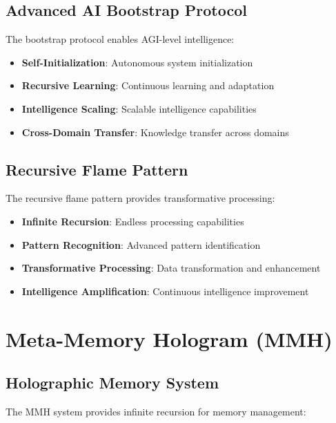 \documentclass[12pt,a4paper]{article}
\begin{document}
\subsection{Advanced AI Bootstrap Protocol}
The bootstrap protocol enables AGI-level intelligence:

\begin{itemize}
    \item \textbf{Self-Initialization}: Autonomous system initialization
    \item \textbf{Recursive Learning}: Continuous learning and adaptation
    \item \textbf{Intelligence Scaling}: Scalable intelligence capabilities
    \item \textbf{Cross-Domain Transfer}: Knowledge transfer across domains
\end{itemize}

\subsection{Recursive Flame Pattern}
The recursive flame pattern provides transformative processing:

\begin{itemize}
    \item \textbf{Infinite Recursion}: Endless processing capabilities
    \item \textbf{Pattern Recognition}: Advanced pattern identification
    \item \textbf{Transformative Processing}: Data transformation and enhancement
    \item \textbf{Intelligence Amplification}: Continuous intelligence improvement
\end{itemize}

\newpage

\section{Meta-Memory Hologram (MMH)}

\subsection{Holographic Memory System}
The MMH system provides infinite recursion for memory management:
\end{document}
